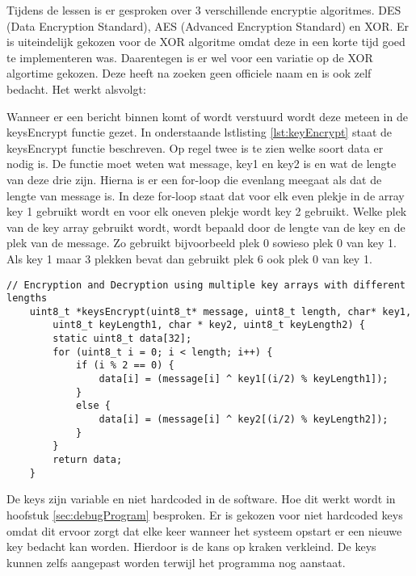 Tijdens de lessen is er gesproken over 3 verschillende encryptie algoritmes. DES (Data Encryption Standard), AES (Advanced Encryption Standard)
en XOR. Er is uiteindelijk gekozen voor de XOR algoritme omdat deze in een korte tijd goed te implementeren was. Daarentegen is er wel voor
een variatie op de XOR algortime gekozen. Deze heeft na zoeken geen officiele naam en is ook zelf bedacht.
Het werkt alsvolgt:

Wanneer er een bericht binnen komt of wordt verstuurd wordt deze meteen in de keysEncrypt functie gezet. In onderstaande lstlisting \ref{lst:keyEncrypt} 
staat  de keysEncrypt functie beschreven. Op regel twee is te zien welke soort data er nodig is. De functie moet weten wat message, key1 en
key2 is en wat de lengte van deze drie zijn. Hierna is er een for-loop die evenlang meegaat als dat de lengte van message is. In deze 
for-loop staat dat voor elk even plekje in de array key 1 gebruikt wordt en voor elk oneven plekje wordt key 2 gebruikt. Welke plek 
van de key array gebruikt wordt, wordt bepaald door de lengte van de key en de plek van de message. Zo gebruikt bijvoorbeeld plek 0 
sowieso plek 0 van key 1. Als key 1 maar 3 plekken bevat dan gebruikt plek 6 ook plek 0 van key 1. 

\begin{lstlisting}[caption={keyEncrypt Functie},captionpos=b,label={lst:keyEncrypt},style=c,xleftmargin=.\textwidth,xrightmargin=.\textwidth]
    // Encryption and Decryption using multiple key arrays with different lengths
    uint8_t *keysEncrypt(uint8_t* message, uint8_t length, char* key1, 
        uint8_t keyLength1, char * key2, uint8_t keyLength2) {
        static uint8_t data[32];
        for (uint8_t i = 0; i < length; i++) {
            if (i % 2 == 0) {  
                data[i] = (message[i] ^ key1[(i/2) % keyLength1]);
            }
            else {
                data[i] = (message[i] ^ key2[(i/2) % keyLength2]);
            }
        }
        return data;
    }
\end{lstlisting}

De keys zijn variable en niet hardcoded in de software. Hoe dit werkt wordt in hoofstuk \ref{sec:debugProgram} besproken. 
Er is gekozen voor niet hardcoded keys omdat dit ervoor zorgt dat elke keer wanneer het systeem opstart er een nieuwe key bedacht 
kan worden. Hierdoor is de kans op kraken verkleind. De keys kunnen zelfs aangepast worden terwijl het programma nog aanstaat.         